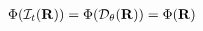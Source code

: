 \begin{defi}
\begin{align*}
  \end{align*}\\[-9mm]
  \begin{align*}
        \Phi(\mathcal{I}_{t}(\mathbf{R})) = \Phi(\mathcal{D}_{\theta}(\mathbf{R})) = \Phi(\mathbf{R})
  \end{align*}
\end{defi}






